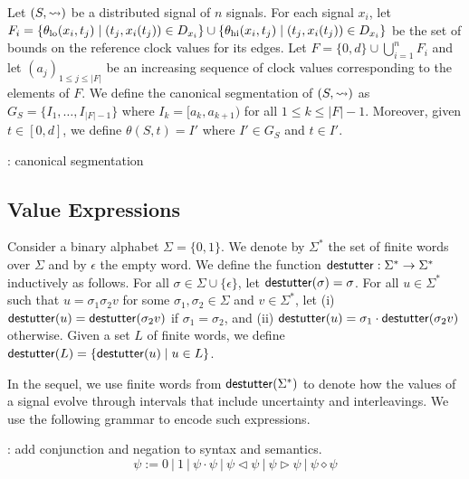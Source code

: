 Let $(S,{\rightsquigarrow})$ be a distributed signal of $n$ signals.
For each signal $x_i$, let $F_i = \{\theta_{\text{lo}}(x_i, t_j) \st (t_j, x_i(t_j)) \in D_{x_i}\} \cup \{\theta_{\text{hi}}(x_i, t_j) \st (t_j, x_i(t_j)) \in D_{x_i}\}$ be the set of bounds on the reference clock values for its edges.
Let $F = \{0, d\} \cup \bigcup_{i = 1}^{n} F_i$ and let $(a_j)_{1 \leq j \leq |F|}$ be an increasing sequence of clock values corresponding to the elements of $F$.
We define the canonical segmentation of $(S,{\rightsquigarrow})$ as $G_S = \{I_1, \ldots, I_{|F| - 1}\}$ where $I_k = [a_k, a_{k+1})$ for all $1 \leq k \leq |F| - 1$.
Moreover, given $t \in [0,d]$, we define $\theta(S,t) = I'$ where $I' \in G_S$ and $t \in I'$.

\begin{example}
	\TODO: canonical segmentation
\end{example}


\subsection{Value Expressions}

Consider a binary alphabet $\Sigma = \{0,1\}$.
We denote by $\Sigma^*$ the set of finite words over $\Sigma$ and by $\epsilon$ the empty word.
We define the function $\mathsf{destutter} : \Sigma^* \to \Sigma^*$ inductively as follows.
For all $\sigma \in \Sigma \cup \{\epsilon\}$, let $\mathsf{destutter}(\sigma) = \sigma$.
For all $u \in \Sigma^*$ such that $u = \sigma_1 \sigma_2 v$ for some $\sigma_1,\sigma_2 \in \Sigma$ and $v \in \Sigma^*$, let (i) $\mathsf{destutter}(u) = \mathsf{destutter}(\sigma_2 v)$ if $\sigma_1 = \sigma_2$, and (ii) $\mathsf{destutter}(u) = \sigma_1 \cdot \mathsf{destutter}(\sigma_2 v)$ otherwise.
Given a set $L$ of finite words, we define $\destutter(L) = \{\destutter(u) \st u \in L\}$.

In the sequel, we use finite words from $\mathsf{destutter}(\Sigma^*)$ to denote how the values of a signal evolve through intervals that include uncertainty and interleavings.
We use the following grammar to encode such expressions.

\TODO: add conjunction and negation to syntax and semantics.
$$ \psi := 0 ~|~ 1 ~|~ \psi \cdot \psi ~|~ \psi \triangleleft \psi ~|~ \psi \triangleright \psi ~|~ \psi \diamond \psi $$


